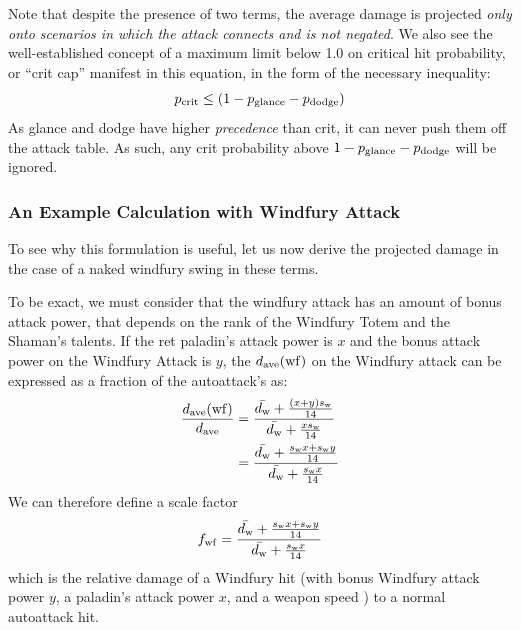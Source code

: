 Note that despite the presence of two \pdodge terms, the average damage is projected \emph{only onto scenarios in which the attack connects and is not negated}.
We also see the well-established concept of a maximum limit below 1.0 on critical hit probability, or ``crit cap'' manifest in this equation, in the form of the necessary inequality:
\begin{equation}
	p_{\mathrm{crit}}  \leq (1-p_{\mathrm{glance}}  - p_{\mathrm{dodge}} )
\end{equation}
As glance and dodge have higher \emph{precedence} than crit, it can never push them off the attack table.
As such, any crit probability above $1 - p_{\mathrm{glance}}  - p_{\mathrm{dodge}} $ will be ignored.

\subsubsection{An Example Calculation with Windfury Attack}
To see why this formulation is useful, let us now derive the projected damage in the case of a naked windfury swing in these terms.

To be exact, we must consider that the windfury attack has an amount of bonus attack power, that depends on the rank of the Windfury Totem and the Shaman's talents.
If the ret paladin's attack power is $x$ and the bonus attack power on the Windfury Attack is $y$, the $d_{\mathrm{ave}} (\mathrm{wf})$ on the Windfury attack can be expressed as a fraction of the autoattack's \dave as:
\begin{equation*}
	\begin{aligned}
		\frac{d_{\mathrm{ave}} (\mathrm{wf})}{d_{\mathrm{ave}} } &= \frac{\bar{d_\mathrm{w}}  + \frac{(x+y)s_\mathrm{w} }{14}}{\bar{d_\mathrm{w} } + \frac{xs_\mathrm{w} }{14}} \\
		&= \frac{\bar{d_\mathrm{w}}  + \frac{s_\mathrm{w}  x + s_\mathrm{w}  y}{14}}{\bar{d_\mathrm{w}}  + \frac{s_\mathrm{w}  x}{14}}
	\end{aligned}
\end{equation*}
We can therefore define a scale factor
\begin{equation}
	f_{\mathrm{wf}}  = \frac{\bar{d_\mathrm{w}}  + \frac{s_\mathrm{w}  x + s_\mathrm{w}  y}{14}}{\bar{d_\mathrm{w}}  + \frac{s_\mathrm{w}  x}{14}}
\end{equation}
which is the relative damage of a Windfury hit (with bonus Windfury attack power $y$, a paladin's attack power $x$, and a weapon speed \ws) to a normal autoattack hit.


